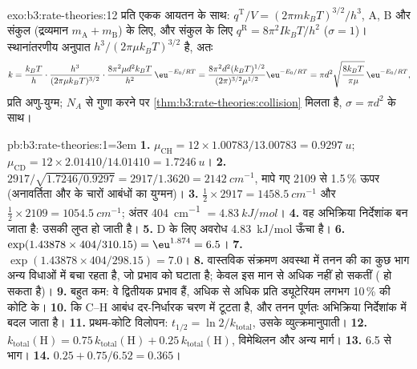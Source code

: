 \begin{solution}{exo:b3:rate-theories:12}
प्रति एकक आयतन  के साथ: $q^{\mathrm T}/V = (2\pi mk_BT)^{3/2}/h^3$, A, B और संकुल (द्रव्यमान $m_{\mathrm A} + m_{\mathrm B}$) के लिए,
और संकुल के लिए $q^{\mathrm R} = 8\pi^2Ik_BT/h^2$
($\sigma = 1$)। स्थानांतरणीय अनुपात $h^3/(2\pi\mu k_BT)^{3/2}$ है, अतः
\[
  k = \frac{k_BT}{h}\cdot\frac{h^3}{(2\pi\mu k_BT)^{3/2}}\cdot\frac{8\pi^2\mu d^2k_BT}{h^2}\,\eu^{-E_0/RT}
    = \frac{8\pi^2d^2(k_BT)^{1/2}}{(2\pi)^{3/2}\mu^{1/2}}\eu^{-E_0/RT}
    = \pi d^2\sqrt{\frac{8k_BT}{\pi\mu}}\,\eu^{-E_0/RT},
\]
प्रति अणु-युग्म; $N_A$ से गुणा करने पर \cref{thm:b3:rate-theories:collision} मिलता है,
$\sigma = \pi d^2$ के साथ।
\end{solution}

\begin{solution}{pb:b3:rate-theories:1}\emergencystretch=3em
\textbf{1.} $\mu_{\mathrm{CH}} = 12 \times 1.00783/13.00783 = \qty{0.9297}{u}$; $\mu_{\mathrm{CD}} = 12 \times 2.01410/14.01410 =
\qty{1.7246}{u}$।
\textbf{2.} $2917/\sqrt{1.7246/0.9297} = 2917/1.3620 = \qty{2142}{cm^{-1}}$, मापे गए 2109 से 1.5\,\%
ऊपर (अनावर्तिता और  के चारों आबंधों का युग्मन)।
\textbf{3.} $\frac12 \times 2917 = \qty{1458.5}{cm^{-1}}$ और $\frac12 \times 2109 = \qty{1054.5}{cm^{-1}}$; अंतर
\qty{404}{cm^{-1}} $= \qty{4.83}{kJ/mol}$।
\textbf{4.} वह अभिक्रिया निर्देशांक बन जाता है: उसकी  लुप्त हो जाती है।
\textbf{5.} D के लिए अवरोध \qty{4.83}{kJ/mol} ऊँचा है।
\textbf{6.} $\exp(1.43878 \times 404/310.15) = \eu^{1.874} = 6.5$।
\textbf{7.} $\exp(1.43878 \times 404/298.15) = 7.0$।
\textbf{8.} वास्तविक संक्रमण अवस्था में तनन की  का कुछ भाग
अन्य विधाओं में बचा रहता है, जो प्रभाव को घटाता है; केवल 
इस मान से अधिक नहीं हो सकतीं ( हो सकता है)।
\textbf{9.} बहुत कम: वे द्वितीयक प्रभाव हैं, अधिक से अधिक प्रति ड्यूटेरियम लगभग 10\,\% की
कोटि के।
\textbf{10.} कि C--H आबंध दर-निर्धारक चरण में टूटता है, और
तनन पूर्णतः अभिक्रिया निर्देशांक में बदल जाता है।
\textbf{11.} प्रथम-कोटि विलोपन: $t_{1/2} = \ln2/k_{\mathrm{total}}$, उसके व्युत्क्रमानुपाती।
\textbf{12.} $k_{\mathrm{total}}(\mathrm H) = 0.75\,k_{\mathrm{total}}(\mathrm H) + 0.25\,k_{\mathrm{total}}(\mathrm H)$, विमेथिलन और अन्य मार्ग।
\textbf{13.} 6.5 से भाग।
\textbf{14.} $0.25 + 0.75/6.52 = 0.365$।

\end{solution}
